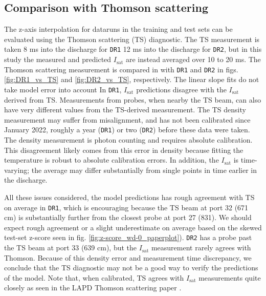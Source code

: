 
\subsection{Comparison with Thomson scattering}

The z-axis interpolation for dataruns in the training and test sets can be evaluated using the Thomson scattering (TS) diagnostic. The TS measurement is taken 8 ms into the discharge for \texttt{DR1} 12 ms into the discharge for \texttt{DR2}, but in this study the measured and predicted $I_\text{sat}$ are instead averaged over 10 to 20 ms. The Thomson scattering measurement is compared in with \texttt{DR1} and \texttt{DR2} in figs. \ref{fig:DR1_vs_TS} and \ref{fig:DR2_vs_TS}, respectively. The linear slope fits do not take model error into account In \texttt{DR1}, $I_\text{sat}$ predictions disagree with the $I_\text{sat}$ derived from TS. Measurements from probes, when nearby the TS beam, can also have very different values from the TS-derived measurement. The TS density measurement may suffer from misalignment, and has not been calibrated since January 2022, roughly a year (\texttt{DR1}) or two (\texttt{DR2}) before these data were taken. The density measurement is photon counting and requires absolute calibration. This disagreement likely comes from this error in density because fitting the temperature is robust to absolute calibration errors. In addition, the $I_\text{sat}$ is time-varying; the average may differ substantially from single points in time earlier in the discharge.

All these issues considered, the model predictions has rough agreement with TS on average in \texttt{DR1}, which is encouraging because the TS beam at port 32 (671 cm) is substantially further from the closest probe at port 27 (831). We should expect rough agreement or a slight underestimate on average based on the skewed test-set z-score seen in fig. \ref{fig:z-score_wd-0_paperplot}). \texttt{DR2} has a probe past the TS beam at port 33 (639 cm), but the $I_\text{sat}$ measurement rarely agrees with Thomson. Because of this density error and measurement time discrepancy, we conclude that the TS diagnostic may not be a good way to verify the predictions of the model. Note that, when calibrated, TS agrees with $I_\text{sat}$ measurements quite closely as seen in the LAPD Thomson scattering paper \cite{ghazaryan_thomson_2022}.

